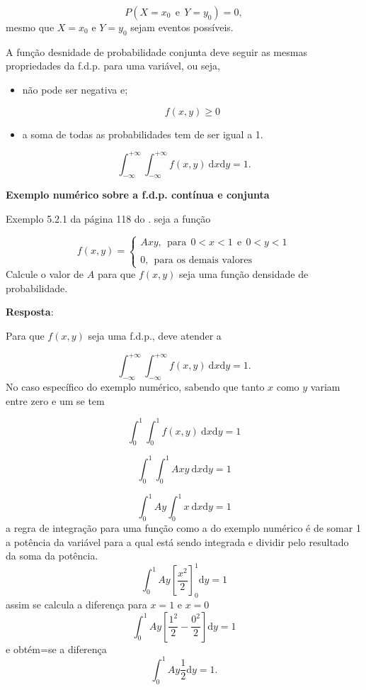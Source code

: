 \documentclass[
]{book}
\begin{document}
\[
  P(X=x_0~~\text{e}~~Y=y_0) = 0,
\]
mesmo que \(X=x_0\) e \(Y=y_0\) sejam eventos possíveis.

A função desnidade de probabilidade conjunta deve seguir as mesmas propriedades da f.d.p. para uma variável, ou seja,

\begin{itemize}
\item
  não pode ser negativa e;

  \[
    f(x,y) \geq 0
  \]
\item
  a soma de todas as probabilidades tem de ser igual a 1.
\end{itemize}

\[
  \int_{-\infty}^{+\infty}\int_{-\infty}^{+\infty}f(x,y)~\text{d}x \text{d}y = 1.
\]

\textbf{Exemplo numérico sobre a f.d.p. contínua e conjunta}

Exemplo 5.2.1 da página 118 do \citet{Sartoris2013}. seja a função

\begin{equation}
  f(x,y) = 
    \begin{cases}
      Axy,~~\text{para}~~0 < x < 1~~\text{e}~~0 < y < 1 \\
      \\
      0, ~~\text{para os demais valores}
    \end{cases}
\end{equation}
Calcule o valor de \(A\) para que \(f(x,y)\) seja uma função densidade de probabilidade.

\textbf{Resposta}:

Para que \(f(x,y)\) seja uma f.d.p., deve atender a

\[
  \int_{-\infty}^{+\infty}\int_{-\infty}^{+\infty}f(x,y)~\text{d}x \text{d}y = 1.
\]
No caso específico do exemplo numérico, sabendo que tanto \(x\) como \(y\) variam entre zero e um se tem

\[
  \int_{0}^{1}\int_{0}^{1}f(x,y)~\text{d}x \text{d}y = 1
\]

\[
  \int_{0}^{1}\int_{0}^{1}Axy ~\text{d}x \text{d}y = 1
\]

\[
  \int_{0}^{1}Ay\int_{0}^{1}x~\text{d}x \text{d}y = 1
\]
a regra de integração para uma função como a do exemplo numérico é de somar 1 a potência da variável para a qual está sendo integrada e dividir pelo resultado da soma da potência.
\[
  \int_{0}^{1}Ay\left[ \dfrac{x^2}{2} \right]_{0}^{1} \text{d}y = 1
\]
assim se calcula a diferença para \(x=1\) e \(x=0\)
\[
  \int_{0}^{1}Ay\left[ \dfrac{1^2}{2} - \dfrac{0^2}{2} \right] \text{d}y = 1
\]
e obtém=se a diferença
\[
  \int_{0}^{1}Ay\dfrac{1}{2} \text{d}y = 1.
\]
\end{document}
